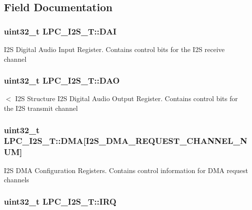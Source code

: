 \subsection{Field Documentation}
\hypertarget{structLPC__I2S__T_ab94e2f49e7d70f8b19c3d74f2e67878e}{
\subsubsection[{D\-A\-I}]{ uint32\-\_\-t L\-P\-C\-\_\-\-I2\-S\-\_\-\-T\-::\-D\-A\-I}}\label{structLPC__I2S__T_ab94e2f49e7d70f8b19c3d74f2e67878e}
I2\-S Digital Audio Input Register. Contains control bits for the I2\-S receive channel \hypertarget{structLPC__I2S__T_ad574a0e2f1cdec634e05ee8176c0450e}{
\subsubsection[{D\-A\-O}]{ uint32\-\_\-t L\-P\-C\-\_\-\-I2\-S\-\_\-\-T\-::\-D\-A\-O}}\label{structLPC__I2S__T_ad574a0e2f1cdec634e05ee8176c0450e}
$<$ I2\-S Structure I2\-S Digital Audio Output Register. Contains control bits for the I2\-S transmit channel \hypertarget{structLPC__I2S__T_a2259283a5ad23aa09617861948df25d7}{
\subsubsection[{D\-M\-A}]{ uint32\-\_\-t L\-P\-C\-\_\-\-I2\-S\-\_\-\-T\-::\-D\-M\-A\mbox{[}{\bf I2\-S\-\_\-\-D\-M\-A\-\_\-\-R\-E\-Q\-U\-E\-S\-T\-\_\-\-C\-H\-A\-N\-N\-E\-L\-\_\-\-N\-U\-M}\mbox{]}}}\label{structLPC__I2S__T_a2259283a5ad23aa09617861948df25d7}
I2\-S D\-M\-A Configuration Registers. Contains control information for D\-M\-A request channels \hypertarget{structLPC__I2S__T_a0ed73323cb1c577293f1416c6c55c47f}{
\subsubsection[{I\-R\-Q}]{ uint32\-\_\-t L\-P\-C\-\_\-\-I2\-S\-\_\-\-T\-::\-I\-R\-Q}}\label{structLPC__I2S__T_a0ed73323cb1c577293f1416c6c55c47f}
